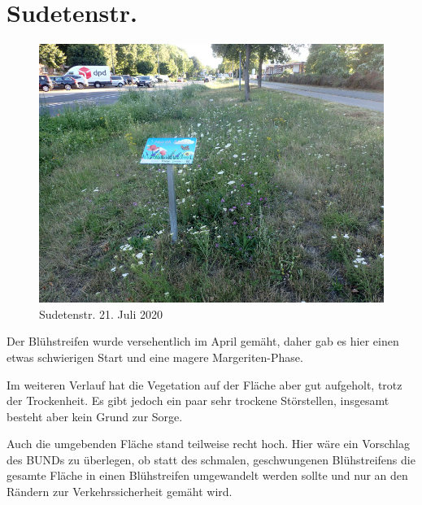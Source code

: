 \documentclass[10pt]{article}
\begin{document}
\clearpage
\section{Sudetenstr.}
\begin{figure}[h!]
  \includegraphics[width=\linewidth]{img/asg/juli.jpg}
  \caption{Sudetenstr. 21. Juli 2020}
\end{figure}
Der Blühstreifen wurde versehentlich im April gemäht, daher gab es hier einen etwas schwierigen Start und eine magere Margeriten-Phase.

Im weiteren Verlauf hat die Vegetation auf der Fläche aber gut aufgeholt, trotz der Trockenheit. 
Es gibt jedoch ein paar sehr trockene Störstellen, insgesamt besteht aber kein Grund zur Sorge. 

Auch die umgebenden Fläche stand teilweise recht hoch. Hier wäre ein Vorschlag des BUNDs zu überlegen, ob statt des schmalen, geschwungenen Blühstreifens die gesamte Fläche in einen Blühstreifen umgewandelt werden sollte und nur an den Rändern zur Verkehrssicherheit gemäht wird.

\clearpage
\end{document}

